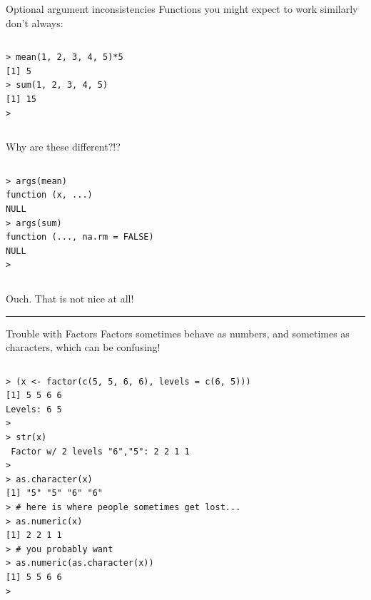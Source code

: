 \documentclass[table,smaller]{beamer}
\begin{document}
\begin{frame}[fragile,label=sec-8-5]{Optional argument inconsistencies}
 Functions you might expect to work similarly don't always:

\vspace{-.5em}
\begin{columns}
\begin{block}{}
\begin{verbatim}
> mean(1, 2, 3, 4, 5)*5
[1] 5
> sum(1, 2, 3, 4, 5)
[1] 15
>
\end{verbatim}
\end{block}
\end{columns}
\vspace{.5em}

Why are these different?!?
\vspace{-.5em}
\begin{columns}
\begin{block}{}
\begin{verbatim}
> args(mean)
function (x, ...) 
NULL
> args(sum)
function (..., na.rm = FALSE) 
NULL
>
\end{verbatim}
\end{block}
\end{columns}
\vspace{.5em}

Ouch. That is not nice at all!

\rule{\linewidth}{0.5pt}
\end{frame}
\begin{frame}[fragile,label=sec-8-6]{Trouble with Factors}
 Factors sometimes behave as numbers, and sometimes as characters, which can be confusing!

\vspace{-.5em}
\begin{columns}
\begin{block}{}
\begin{verbatim}
> (x <- factor(c(5, 5, 6, 6), levels = c(6, 5)))
[1] 5 5 6 6
Levels: 6 5
> 
> str(x)
 Factor w/ 2 levels "6","5": 2 2 1 1
> 
> as.character(x)
[1] "5" "5" "6" "6"
> # here is where people sometimes get lost...
> as.numeric(x)
[1] 2 2 1 1
> # you probably want
> as.numeric(as.character(x))
[1] 5 5 6 6
>
\end{verbatim}
\end{block}
\end{columns}
\vspace{.5em}
\end{frame}
\end{document}
